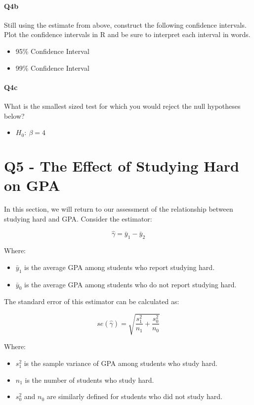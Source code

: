 \documentclass[12pt]{article}		%
\begin{document}
\vspace{2cm}

\paragraph*{Q4b} Still using the estimate from above, construct the following confidence intervals. Plot the confidence intervals in R and be sure to interpret each interval in words.

\begin{itemize}
	\item[] 95\% Confidence Interval
	\item[] 99\% Confidence Interval
\end{itemize}


\paragraph*{Q4c} What is the smallest sized test for which you would reject the null hypotheses below?

\begin{itemize}
	\item[] $H_0: \: \beta=4$
\end{itemize}



\clearpage

\section*{Q5 - The Effect of Studying Hard on GPA}

In this section, we will return to our assessment of the relationship between studying hard and GPA. Consider the estimator:

$$\hat{\gamma} = \bar{y}_1 - \bar{y}_2 $$

Where:
\begin{itemize}
	\item $\bar{y}_1$ is the average GPA among students who report studying hard.
	\item $\bar{y}_0$ is the average GPA among students who do not report studying hard.
\end{itemize}

The standard error of this estimator can be calculated as:

$$ se(\hat{\gamma}) = \sqrt{ \frac{s^2_1}{n_1}+\frac{s^2_0}{n_0}}$$

Where:
\begin{itemize}
	\item $s^2_1$ is the sample variance of GPA among students who study hard.
	\item $n_1$ is the number of students who study hard.
	\item $s^2_0$ and $n_0$ are similarly defined for students who did not study hard.
\end{itemize}
\end{document}
